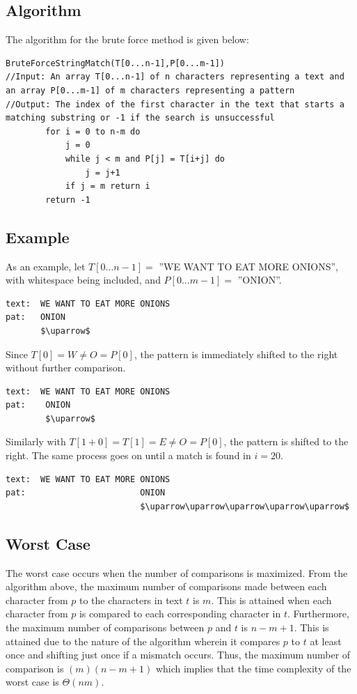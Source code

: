 \subsection{Algorithm}
The algorithm for the brute force method is given below:
\begin{lstlisting}
BruteForceStringMatch(T[0...n-1],P[0...m-1])
//Input: An array T[0...n-1] of n characters representing a text and an array P[0...m-1] of m characters representing a pattern
//Output: The index of the first character in the text that starts a matching substring or -1 if the search is unsuccessful
		for i = 0 to n-m do
			j = 0
			while j < m and P[j] = T[i+j] do
				j = j+1
			if j = m return i
		return -1 
\end{lstlisting} 
\subsection{Example}
As an example, let $T[0...n-1]=$ ''WE WANT TO EAT MORE ONIONS'', with whitespace being included, and $P[0...m-1]=$ ''ONION''.


\begin{lstlisting}
text:  WE WANT TO EAT MORE ONIONS
pat:   ONION
       $\uparrow$
\end{lstlisting}

Since $T[0] = W \neq O = P[0]$, the pattern is immediately shifted to the right without further comparison.

\begin{lstlisting}
text:  WE WANT TO EAT MORE ONIONS
pat:    ONION
        $\uparrow$
\end{lstlisting}

Similarly with $T[1+0] = T[1] = E \neq O = P[0]$, the pattern is shifted to the right. The same process goes on until a match is found in $i=20$.

\begin{lstlisting}
text:  WE WANT TO EAT MORE ONIONS
pat:                       ONION
                           $\uparrow\uparrow\uparrow\uparrow\uparrow$
\end{lstlisting}

\subsection{Worst Case}    
The worst case occurs when the number of comparisons is maximized. From the algorithm above, the maximum number of comparisons made between each character from $p$ to the characters in text $t$ is $m$. This is attained when each character from $p$ is compared to each corresponding character in $t$. Furthermore, the maximum number of comparisons between $p$ and $t$ is $n-m+1$. This is attained due to the nature of the algorithm wherein it compares $p$ to $t$ at least once and shifting just once if a mismatch occurs. Thus, the maximum number of comparison is $(m)(n-m+1)$ which implies that the time complexity of the worst case is $\Theta(nm)$.


